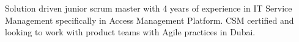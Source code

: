 

\begin{cvparagraph}

Solution driven junior scrum master with 4 years of experience in IT Service Management specifically in Access Management Platform. CSM certified and looking to work with product teams with Agile practices in Dubai.
\end{cvparagraph}
